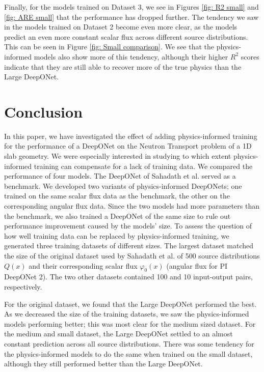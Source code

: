 \documentclass[%
 reprint,
 amsmath,amssymb,
 aps,
]{revtex4-1}
\begin{document}
Finally, for the models trained on Dataset 3, we see in Figures \ref{fig: R2 small} and \ref{fig: ARE small} that the performance has dropped further. The
tendency we saw in the models trained on Dataset 2 become even more clear, as the models predict an even more constant scalar flux across different source
distributions. This can be seen in Figure \ref{fig: Small comparison}. We see that the physics-informed models also show more of this tendency, although
their higher $R^2$ scores indicate that they are still able to recover more of the true physics than the Large DeepONet.

\section{Conclusion}

In this paper, we have investigated the effect of adding physics-informed training for the performance of a DeepONet on the Neutron Transport problem of
a 1D slab geometry. We were especially interested in studying to which extent physics-informed training can compensate for a lack of training data.
We compared the performance of four models. The DeepONet of Sahadath et al. \cite{sahadath2026characterization} served as a benchmark. We developed two
variants of physics-informed DeepONets; one trained on the same scalar flux data as the benchmark, the other on the corresponding angular flux data. Since
the two models had more parameters than the benchmark, we also trained a DeepONet of the same size to rule out performance improvement caused by the models'
size. To assess the question of how well training data can be replaced by physics-informed training, we generated three training datasets of different sizes.
The largest dataset matched the size of the original dataset used by Sahadath et al. of 500 source distributions $Q(x)$ and their corresponding scalar flux
$\varphi_0(x)$ (angular flux for PI DeepONet 2). The two other datasets contained 100 and 10 input-output pairs, respectively.

For the original dataset, we found that the Large DeepONet performed the best. As we decreased the size of the training datasets, we saw the physics-informed
models performing better; this was most clear for the medium sized dataset. For the medium and small dataset, the Large DeepONet settled to an almost constant
prediction across all source distributions. There was some tendency for the physics-informed models to do the same when trained on the small dataset, although
they still performed better than the Large DeepONet.
\end{document}
